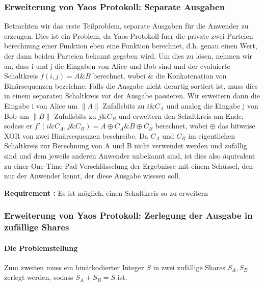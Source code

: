 \documentclass{article}
\newcounter{requirementscount}{}
\newcommand{\requirement}[1] {
        \addtocounter{requirementscount}{1}
        {\bf Requirement \therequirementscount:} #1\\
    }
\begin{document}
\subsubsection{Erweiterung von Yaos Protokoll:  Separate Ausgaben}
Betrachten wir das erste Teilproblem, separate Ausgaben f\"ur die Anwender
zu erzeugen. Dies ist ein Problem, da Yaos Protokoll fuer die private 
zwei Parteien berechnung einer Funktion eben eine Funktion berechnet, d.h.
genau einen Wert, der dann beiden Parteien bekannt gegeben wird. 
Um dies zu l\"osen, nehmen wir an, dass i und j die Eingaben von Alice
und Bob sind und der evaluierte Schaltkreis \(f(i, j) = A \& B\) berechnet,
wobei \(\&\) die Konkatenation von Bin\"arsequenzen bezeichne.
Falls die Ausgabe nicht derartig sortiert ist, muss dies in einem separaten
Schaltkreis vor der Ausgabe passieren. Wir erweitern dann die Eingabe i
von Alice um \(\|A\|\) Zufallsbits zu \(i \& C_A\) und analog die Eingabe
j von Bob um \(\|B\|\) Zufallsbits zu \(j \& C_B\) und erweitern den 
Schaltkreis am Ende, sodass er 
\(f'(i\&C_A, j\&C_B) = A \oplus C_A \& B \oplus C_B\) berechnet, wobei
\(\oplus\) das bitweise XOR von zwei Bin\"arsequenzen beschreibe. Da \(C_A\)
und \(C_B\) im eigentlichen Schaltkreis zur Berechnung von A und B nicht
verwendet werden und zuf\"allig sind und dem jeweils anderen Anwender 
unbekannt sind, ist dies also \"aquivalent zu einer 
One-Time-Pad-Verschl\"usselung der Ergebnisse mit einem Sch\"ussel, den
nur der Anwender kennt, der diese Ausgabe wisssen soll.\\
\requirement{Es ist m\"oglich, einen Schaltkreis so zu erweitern}

\subsubsection{Erweiterung von Yaos Protokoll: Zerlegung der Ausgabe in zuf\"allige Shares}
\paragraph{Die Problemstellung}
Zum zweiten muss ein bin\"arkodierter Integer \(S\) in zwei zuf\"allige Shares 
\(S_A, S_B\) zerlegt werden, sodass \(S_A + S_B = S\) ist. 
\end{document}
